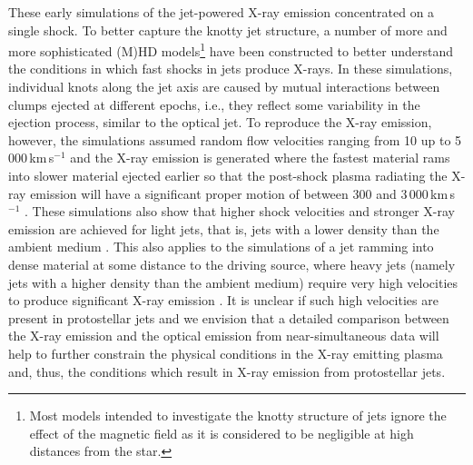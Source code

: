 \documentclass[graybox, nosecnum]{svmult}
\begin{document}
These early simulations of the jet-powered X-ray emission concentrated on a single shock. To better capture the knotty jet structure, a number of more and more sophisticated (M)HD models\footnote{Most models intended to investigate the knotty structure of jets ignore the effect of the magnetic field as it is considered to be negligible at high distances from the star.} 
have been constructed to better understand the conditions in which fast shocks in jets produce X-rays. 
In these simulations, individual knots along the jet axis are caused by mutual interactions between clumps ejected at different epochs, i.e., they reflect some variability in the ejection process, similar to the optical jet.
To reproduce the X-ray emission, however, the simulations assumed random flow velocities ranging from 10 up to 5\,000\,km\,s$^{-1}$ and the X-ray emission is generated where the fastest material rams into slower material ejected earlier so that the post-shock plasma radiating the X-ray emission will have a significant proper motion of
between 300 and 3\,000\,km\,s$^{-1}$ \cite{Bonito_2010a,Bonito_2010b}.
These simulations also show that higher shock velocities and stronger X-ray emission are achieved for light jets, that is, jets with a lower density than the ambient medium \cite[see also][]{Bonito_2007}. This also applies to the simulations of a jet ramming into dense material at some distance to the driving source, where heavy jets (namely jets with a higher density than the ambient medium) require very high velocities to produce significant X-ray emission  \citep[$\gtrsim1\,000$\,km\,s$^{-1}$, e.g.,][]{Lopez_2015}. It is unclear if such high velocities are present in protostellar jets and we envision that a detailed comparison between the X-ray emission and the optical emission from near-simultaneous data will help to further constrain the physical conditions in the X-ray emitting plasma and, thus, the conditions which result in X-ray emission from protostellar jets.
\end{document}
